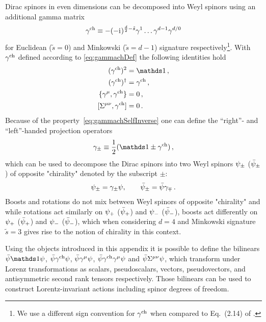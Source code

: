 Dirac spinors in even dimensions can be decomposed into Weyl spinors using an additional gamma matrix
\begin{align}
	\gamma^{\mathrm{ch}} \equiv -(-\mathrm{i}\mkern1mu)^{\frac{d}{2}-\tilde{s}}\gamma^1\ldots\gamma^{d-1}\gamma^{d/0} \label{eq:gammachDef}
\end{align}
for Euclidean ($\tilde{s}=0$) and Minkowski ($\tilde{s}=d-1$) signature respectively\footnote{%
	We use a different sign convention for $\gamma^{\mathrm{ch}}$ when compared to Eq.~(2.14) of .%
}.
With $\gamma^{\mathrm{ch}}$ defined according to \cref{eq:gammachDef} the following identities hold
\begin{align}
	(\gammach)^2&=\Id \, , \label{eq:gammachSelfInverse}\\
	(\gammach)^\dagger&=\gammach \, ,\\
	\{\gamma^\mu,\gammach\}&=0 \, , \label{eq:gammachAntiCommute}\\
	[\Sigma^{\mu\nu},\gammach]&=0 \, .
\end{align}
Because of the property~\eqref{eq:gammachSelfInverse} one can define the ``right''- and ``left''-handed projection operators
\begin{align}
	\gamma_{\pm} \equiv \frac{1}{2}(\Id\pm\gammach) \, ,\label{eq:gammaChProjection}
\end{align}
which can be used to decompose the Dirac spinors into two Weyl spinors $\psi_\pm$ ($\bar{\psi}_\pm$) of opposite "chirality" denoted by the subscript $\pm$:
\begin{align}
	\psi_\pm = \gamma_\pm \psi,\qquad \bar{\psi}_\pm=\bar{\psi}\gamma_\mp \, .\label{eq:psiPM}
\end{align}
Boosts and rotations do not mix between Weyl spinors of opposite "chirality" and while rotations act similarly on $\psi_+$ ($\bar{\psi}_+$) and $\psi_-$ ($\bar{\psi}_-$), boosts act differently on $\psi_+$ ($\bar{\psi}_+$) and $\psi_-$ ($\bar{\psi}_-$), which when considering $d=4$ and Minkowski signature $\tilde{s}=3$ gives rise to the notion of chirality in this context.

Using the objects introduced in this appendix it is possible to define the bilinears $\MFpsib\Id\MFpsi$, $\bar{\psi}\gamma^{\mathrm{ch}}\psi$, $\bar{\psi}\gamma^\mu\psi$, $\bar{\psi}\gamma^{\mathrm{ch}}\gamma^\mu\psi$ and $\bar{\psi}\Sigma^{\mu\nu}\psi$, which transform under Lorenz transformations as scalars, pseudoscalars, vectors, pseudovectors, and antisymmetric second rank tensors respectively.
Those bilinears can be used to construct Lorentz-invariant actions including spinor degrees of freedom.\bigskip

